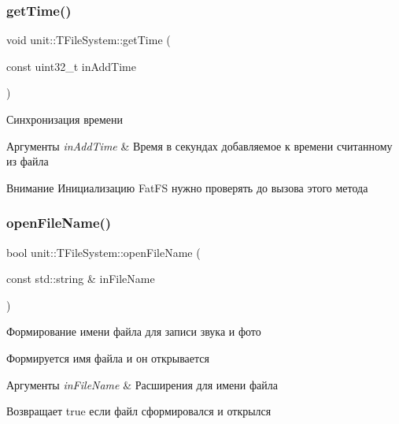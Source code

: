  \mbox{\label{classunit_1_1_t_file_system_a7a1adfdfb63b2071937f1c87b53a2d7e}} 
\subsubsection{\texorpdfstring{get\+Time()}{getTime()}}
{\footnotesize\ttfamily void unit\+::\+T\+File\+System\+::get\+Time (\begin{DoxyParamCaption}\item[{const uint32\+\_\+t}]{in\+Add\+Time }\end{DoxyParamCaption})}



Синхронизация времени 


\begin{DoxyParams}{Аргументы}
{\em in\+Add\+Time} & Время в секундах добавляемое к времени считанному из файла \\
\hline
\end{DoxyParams}
\begin{DoxyAttention}{Внимание}
Инициализацию Fat\+FS нужно проверять до вызова этого метода 
\end{DoxyAttention}
\mbox{\label{classunit_1_1_t_file_system_a80f8d844c27c27cb5998b2d2214d041a}} 
\subsubsection{\texorpdfstring{open\+File\+Name()}{openFileName()}}
{\footnotesize\ttfamily bool unit\+::\+T\+File\+System\+::open\+File\+Name (\begin{DoxyParamCaption}\item[{const std\+::string \&}]{in\+File\+Name }\end{DoxyParamCaption})}



Формирование имени файла для записи звука и фото 



 Формируется имя файла и он открывается 
\begin{DoxyParams}{Аргументы}
{\em in\+File\+Name} & Расширения для имени файла \\
\hline
\end{DoxyParams}
\begin{DoxyReturn}{Возвращает}
true если файл сформировался и открылся 
\end{DoxyReturn}
\mbox{\label{classunit_1_1_t_file_system_a79523b2edca3574ec6254af671f28256}} 
